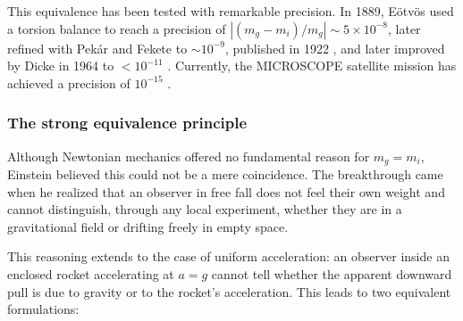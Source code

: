 This equivalence has been tested with remarkable precision. In 1889, Eötvös used a torsion balance to reach a precision of $|{(m_g - m_i)}/{m_g}| \sim 5\times10^{-8}$, later refined with Pekár and Fekete to $\sim10^{-9}$, published in 1922 \cite{EotvosPekarFekete1922}, and later improved by Dicke in 1964 to $< 10^{-11}$ \cite{RollKrotkovDicke1964}. Currently, the MICROSCOPE satellite mission has achieved a precision of $10^{-15}$
\cite{MicroSCOPE2022final}.

\subsubsection{The strong equivalence principle}

Although Newtonian mechanics offered no fundamental reason for $m_g = m_i$, Einstein believed
this could not be a mere coincidence. The breakthrough came when he realized that an observer
in free fall does not feel their own weight and cannot distinguish, through any local experiment,
whether they are in a gravitational field or drifting freely in empty space.

This reasoning extends to the case of uniform acceleration: an observer inside an enclosed
rocket accelerating at $a = g$ cannot tell whether the apparent downward pull is due to
gravity or to the rocket's acceleration. This leads to two equivalent formulations:

\begin{center}
\begin{minipage}{0.9\textwidth}
\begin{center}
\setlength{\fboxsep}{7pt}
\setlength{\fboxrule}{0.75pt}
\end{center}
\end{minipage}
\end{center}

\begin{center}
\begin{minipage}{0.9\textwidth}
\begin{center}
\setlength{\fboxsep}{7pt}
\setlength{\fboxrule}{0.75pt}
\end{center}
\end{minipage}
\end{center}

